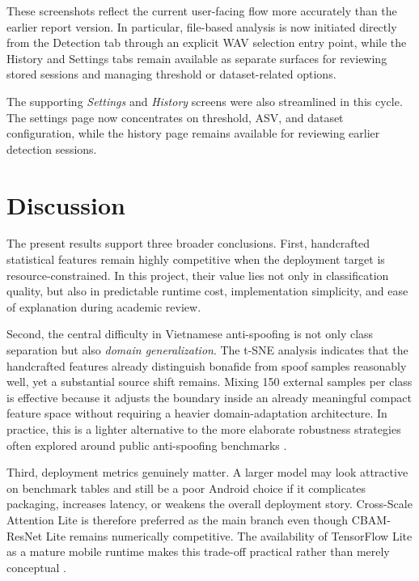 \documentclass[pdflatex,sn-mathphys-num]{sn-jnl}
\begin{document}
These screenshots reflect the current user-facing flow more accurately than the earlier report version. In particular, file-based analysis is now initiated directly from the Detection tab through an explicit WAV selection entry point, while the History and Settings tabs remain available as separate surfaces for reviewing stored sessions and managing threshold or dataset-related options.

The supporting \textit{Settings} and \textit{History} screens were also streamlined in this cycle. The settings page now concentrates on threshold, ASV, and dataset configuration, while the history page remains available for reviewing earlier detection sessions.

\section{Discussion}\label{sec:discussion}

The present results support three broader conclusions. First, handcrafted statistical features remain highly competitive when the deployment target is resource-constrained. In this project, their value lies not only in classification quality, but also in predictable runtime cost, implementation simplicity, and ease of explanation during academic review.

Second, the central difficulty in Vietnamese anti-spoofing is not only class separation but also \textit{domain generalization}. The t-SNE analysis indicates that the handcrafted features already distinguish bonafide from spoof samples reasonably well, yet a substantial source shift remains. Mixing 150 external samples per class is effective because it adjusts the boundary inside an already meaningful compact feature space without requiring a heavier domain-adaptation architecture. In practice, this is a lighter alternative to the more elaborate robustness strategies often explored around public anti-spoofing benchmarks \cite{wu2015asvspoof,wang2020asvspoof2019}.

Third, deployment metrics genuinely matter. A larger model may look attractive on benchmark tables and still be a poor Android choice if it complicates packaging, increases latency, or weakens the overall deployment story. Cross-Scale Attention Lite is therefore preferred as the main branch even though CBAM-ResNet Lite remains numerically competitive. The availability of TensorFlow Lite as a mature mobile runtime makes this trade-off practical rather than merely conceptual \cite{tensorflowlite}.
\end{document}
